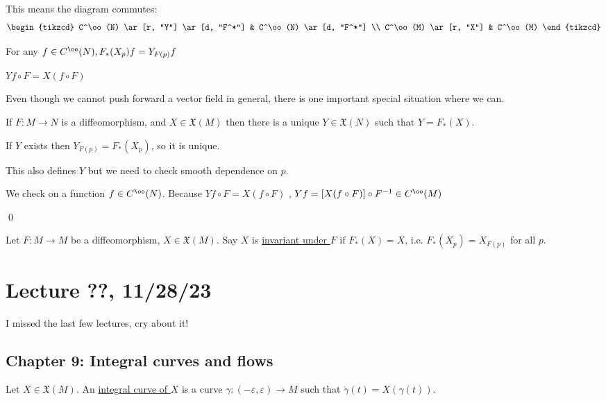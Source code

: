 \documentclass[x11names,reqno,14pt]{extarticle}
\begin{document}
This means the diagram commutes:
\[
\begin{tikzcd}
C^\oo(N) \ar[r, "Y"] \ar[d, "F^*"] & C^\oo(N) \ar[d, "F^*"] \\
C^\oo(M) \ar[r, "X"] & C^\oo(M) 
\end{tikzcd}
\]

For any $f \in C^\oo(N), F_*(X_p)f = Y_{F(p)}f$

$Yf \circ F = X(f \circ F)$

Even though we cannot push forward a vector field in general, there is one important special situation where we can. 

\prop

If $F:M\to N$ is a diffeomorphism, and $X \in \mathfrak{X}(M)$ then there is a unique $Y \in \mathfrak{X}(N)$ such that $Y = F_*(X)$. 

\proof

If $Y$ exists then $Y_{F(p)} = F_*(X_p)$, so it is unique. 

This also defines $Y$ but we need to check smooth dependence on $p$. 

We check on a function $f \in C^\oo(N)$. Because $Yf\circ F = X(f\circ F)$ , $Yf = [X(f\circ F)]\circ F^{-1} \in C^\oo(M)$

\qed


Let $F:M\to M$ be a diffeomorphism, $X \in \mathfrak{X}(M)$. Say $X$ is \underline{invariant under $F$} if $F_*(X) = X$, i.e. $F_*(X_p) = X_{F(p)}$ for all $p$. 




\section*{Lecture ??, 11/28/23}

I missed the last few lectures, cry about it!








\subsection*{Chapter 9: Integral curves and flows}


Let $X \in \mathfrak{X}(M)$. An \underline{integral curve of $X$} is a curve $\gamma:(-\varepsilon,\varepsilon)\to M$ such that $\dot{\gamma}(t) = X(\gamma(t))$. 

\exm
\end{document}

